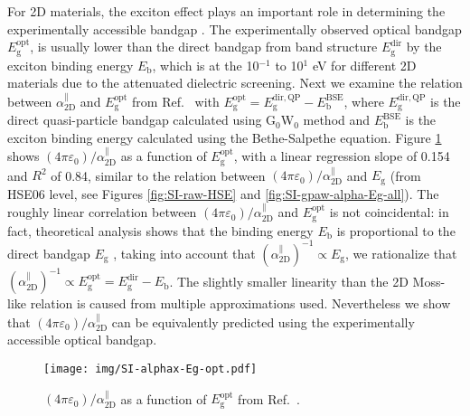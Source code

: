 \documentclass[journal=ancac3,email=true,hyperref=true,keywords=false]{achemso}
\begin{document}
For 2D materials, the exciton effect plays an important role in
determining the experimentally accessible bandgap
\cite{Arnaud_2006_exc_hBN,Pulci_2014,Ramasubramaniam_2012,Chernikov_2014_EB_MoS2_2D3D}. The experimentally observed optical bandgap
$E_{\mathrm{g}}^{\mathrm{opt}}$, is usually lower than the direct
bandgap from band structure $E_{\mathrm{g}}^{\mathrm{dir}}$ by the
exciton binding energy $E_{\mathrm{b}}$, which is at the 10$^{-1}$ to
10$^{1}$ eV for different 2D materials due to the attenuated
dielectric screening. Next we examine the relation between
$\alpha_{\mathrm{2D}}^{\parallel}$ and $E_{\mathrm{g}}^{\mathrm{opt}}$
from Ref.~ with
$E_{\mathrm{g}}^{\mathrm{opt}}=E_{\mathrm{g}}^{\mathrm{dir,QP}}-E_{\mathrm{b}}^{\mathrm{BSE}}$,
where $E_{\mathrm{g}}^{\mathrm{dir,QP}}$ is the direct quasi-particle
bandgap calculated using G$_0$W$_0$ method and
$E_{\mathrm{b}}^{\mathrm{BSE}}$ is the exciton binding energy
calculated using the Bethe-Salpethe equation. Figure \ref{fig:opt}
shows $(4\pi\varepsilon_{0})/\alpha_{\mathrm{2D}}^{\parallel}$ as a
function of $E_{\mathrm{g}}^{\mathrm{opt}}$, with a linear regression
slope of 0.154 and $R^{2}$ of 0.84, similar to the relation between
$(4\pi \varepsilon_{0})/\alpha_{\mathrm{2D}}^{\parallel}$ and
$E_{\mathrm{g}}$ (from HSE06 level, see Figures \ref{fig:SI-raw-HSE}
and \ref{fig:SI-gpaw-alpha-Eg-all}). The roughly linear correlation
between $(4\pi \varepsilon_{0})/\alpha_{\mathrm{2D}}^{\parallel}$ and
$E_{\mathrm{g}}^{\mathrm{opt}}$ is not coincidental: in fact,
theoretical analysis shows that the binding energy $E_{\mathrm{b}}$ is
proportional to the direct bandgap $E_{\mathrm{g}}$
\cite{Jiang_2017_Eg_Eb}, taking into account that
$(\alpha_{\mathrm{2D}}^{\parallel})^{-1} \propto E_{\mathrm{g}}$, we
rationalize that
$(\alpha_{\mathrm{2D}}^{\parallel})^{-1} \propto
E_{\mathrm{g}}^{\mathrm{opt}}=E_{\mathrm{g}}^{\mathrm{dir}}-E_{\mathrm{b}}$. The
slightly smaller linearity than the 2D Moss-like relation is caused
from multiple approximations used. Nevertheless we show that
$(4\pi\varepsilon_{0})/\alpha_{\mathrm{2D}}^{\parallel}$ can be
equivalently predicted using the experimentally accessible optical
bandgap.

\begin{figure}[htbp]
  \centering
  \texttt{[image: img/SI-alphax-Eg-opt.pdf]}
  \caption{$(4\pi\varepsilon_{0})/\alpha_{\mathrm{2D}}^{\parallel}$ as a function of
    $E_{\mathrm{g}}^{\mathrm{opt}}$ from Ref.~.}
  \label{fig:opt}
\end{figure}
\end{document}
